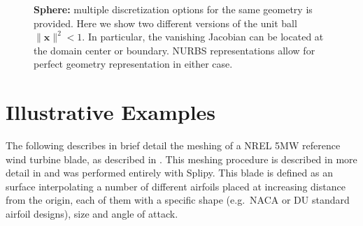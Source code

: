 \documentclass[preprint,12pt, a4paper]{elsarticle}
\begin{document}
\begin{figure}
  \begin{center}
    \hspace{.02\linewidth}
    \caption{\textbf{Sphere:} multiple discretization options for the same geometry is provided. Here we show two different versions of the unit ball $\|\mathbf{x}\|^2<1$. In particular, the vanishing Jacobian can be located at the domain center or boundary. NURBS representations allow for perfect geometry representation in either case.}
    \label{fig:volume-disc}
  \end{center}
\end{figure}

\section{Illustrative Examples}
\label{sec:naca}

The following describes in brief detail the meshing of a NREL 5MW reference wind turbine blade, as described in \cite{Jonkman2009drw}.
This meshing procedure is described in more detail in \cite{Fonn2015sbm} and was performed entirely with Splipy.
This blade is defined as an surface interpolating a number of different airfoils placed at increasing distance from the origin, each of them with a specific shape (e.g.~NACA or DU standard airfoil designs), size and angle of attack.
\end{document}
